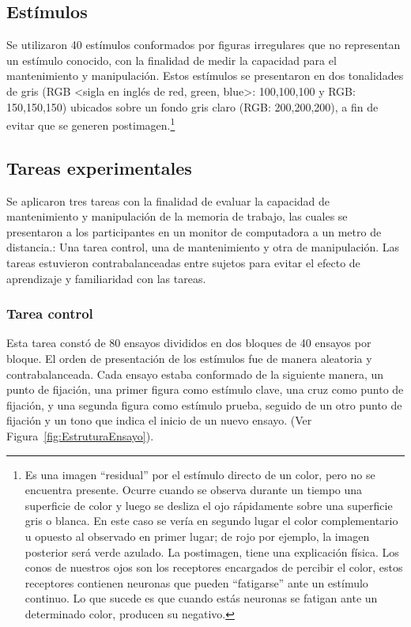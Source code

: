 \documentclass[12pt,letterpaper,final]{article}
\begin{document}
\subsection{Estímulos}
Se utilizaron 40 estímulos conformados por figuras irregulares que no representan un estímulo conocido, con la finalidad de medir la capacidad para el mantenimiento y manipulación. %
Estos estímulos se presentaron en dos tonalidades de gris (RGB \textless sigla en inglés de red, green, blue\textgreater{}: 100,100,100 y RGB: 150,150,150) ubicados sobre un fondo gris claro (RGB: 200,200,200), a fin de  evitar que se generen postimagen.\footnote{Es una imagen ``residual'' por el estímulo directo de un color, pero no se encuentra presente. Ocurre cuando se observa durante un tiempo una superficie de color y luego se desliza el ojo rápidamente sobre una superficie gris o blanca. En este caso se vería en segundo lugar el color complementario u opuesto al observado en primer lugar; de rojo por ejemplo, la imagen posterior será verde azulado. La postimagen, tiene una explicación física. Los conos de nuestros ojos son los receptores encargados de percibir el color, estos receptores contienen neuronas que pueden ``fatigarse'' ante un estímulo continuo. Lo que sucede es que cuando estás neuronas se fatigan ante un determinado color, producen su negativo.}

\subsection{Tareas experimentales}

Se aplicaron tres tareas con la finalidad de evaluar la capacidad de mantenimiento y manipulación de la memoria de trabajo, las cuales se presentaron a los participantes en un monitor de computadora a un metro de distancia.: Una tarea control, una de mantenimiento y otra de manipulación. Las tareas estuvieron contrabalanceadas entre sujetos para evitar el efecto de aprendizaje y familiaridad con las tareas.

\subsubsection{Tarea control}
Esta tarea constó de 80 ensayos divididos en dos bloques de 40 ensayos por bloque. El orden de presentación de los estímulos fue de manera aleatoria y contrabalanceada. Cada ensayo estaba conformado de la siguiente manera, un punto de fijación, una primer figura como estímulo clave, una cruz como punto de fijación, y una segunda figura como estímulo prueba, seguido de un otro punto de fijación y un tono que indica el inicio de un nuevo ensayo.
(Ver Figura~\ref{fig:EstruturaEnsayo}).
\end{document}
